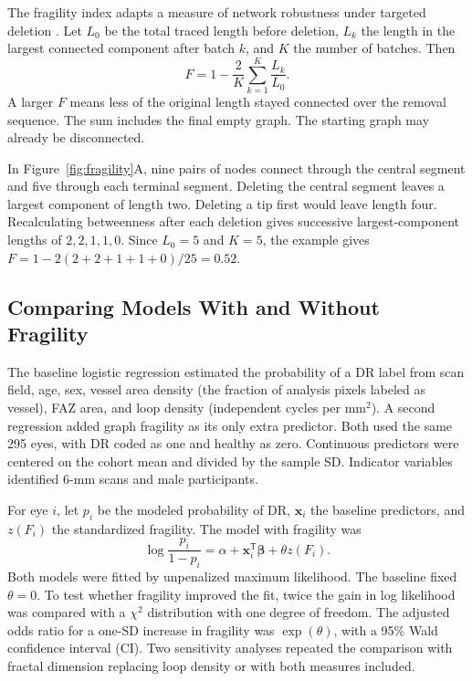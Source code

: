 \documentclass[letterpaper]{article}
\begin{document}
The fragility index adapts a measure of network robustness under targeted deletion \citep{schneider2011mitigation}. Let $L_0$ be the total traced length before deletion, $L_k$ the length in the largest connected component after batch $k$, and $K$ the number of batches. Then
\begin{equation}
 F=1-\frac{2}{K}\sum_{k=1}^{K}\frac{L_k}{L_0}.
 \label{eq:fi}
\end{equation}
A larger $F$ means less of the original length stayed connected over the removal sequence. The sum includes the final empty graph. The starting graph may already be disconnected.

In Figure~\ref{fig:fragility}A, nine pairs of nodes connect through the central segment and five through each terminal segment. Deleting the central segment leaves a largest component of length two. Deleting a tip first would leave length four. Recalculating betweenness after each deletion gives successive largest-component lengths of $2,2,1,1,0$. Since $L_0=5$ and $K=5$, the example gives $F=1-2(2+2+1+1+0)/25=0.52$.

\subsection{Comparing Models With and Without Fragility}
The baseline logistic regression estimated the probability of a DR label from scan field, age, sex, vessel area density (the fraction of analysis pixels labeled as vessel), FAZ area, and loop density (independent cycles per mm$^2$). A second regression added graph fragility as its only extra predictor. Both used the same 295 eyes, with DR coded as one and healthy as zero. Continuous predictors were centered on the cohort mean and divided by the sample SD. Indicator variables identified 6-mm scans and male participants.

For eye $i$, let $p_i$ be the modeled probability of DR, $\mathbf{x}_i$ the baseline predictors, and $z(F_i)$ the standardized fragility. The model with fragility was
\begin{equation}
 \log\frac{p_i}{1-p_i}=\alpha+\mathbf{x}_i^{\mathsf T}\boldsymbol{\beta}
                              +\theta z(F_i).
 \label{eq:logit}
\end{equation}
Both models were fitted by unpenalized maximum likelihood. The baseline fixed $\theta=0$. To test whether fragility improved the fit, twice the gain in log likelihood was compared with a $\chi^2$ distribution with one degree of freedom. The adjusted odds ratio for a one-SD increase in fragility was $\exp(\theta)$, with a 95\% Wald confidence interval (CI). Two sensitivity analyses repeated the comparison with fractal dimension replacing loop density or with both measures included.
\end{document}
